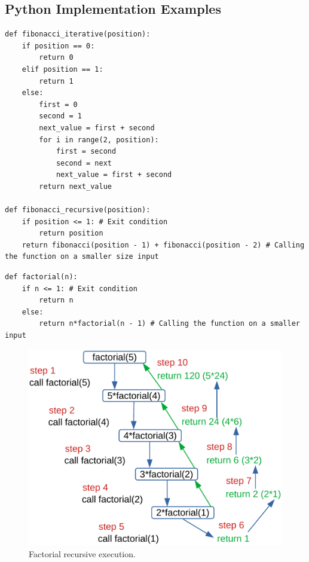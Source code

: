 \subsection{Python Implementation Examples}

\begin{lstlisting}[firstnumber=1, caption={Implementation of the Fibonacci series with both iterative and recursive way.}]
def fibonacci_iterative(position):
	if position == 0:
		return 0
	elif position == 1:
		return 1
	else:
		first = 0
		second = 1
		next_value = first + second
		for i in range(2, position):
			first = second
			second = next
			next_value = first + second
		return next_value

def fibonacci_recursive(position):
	if position <= 1: # Exit condition
		return position
	return fibonacci(position - 1) + fibonacci(position - 2) # Calling the function on a smaller size input
\end{lstlisting}

\begin{lstlisting}[firstnumber=1, caption={Implementation of calculating the factorial of a number using the recursive way.}]
def factorial(n):
	if n <= 1: # Exit condition
		return n
	else: 
		return n*factorial(n - 1) # Calling the function on a smaller input
\end{lstlisting}

\begin{figure}[H]
	\begin{center}
		\includegraphics[scale=.6]{chapters/introduction/images/factorial.pdf}
		\caption[Factorial recursive execution.]{Factorial recursive execution.}
		\label{fig:factorial_1}
	\end{center}
\end{figure}

